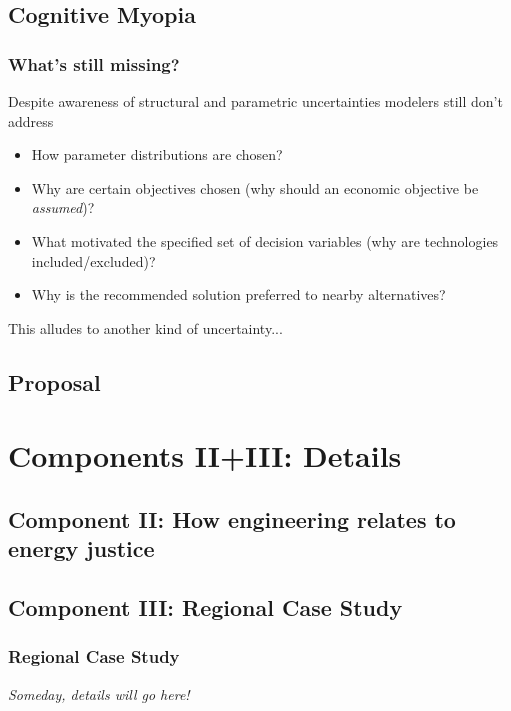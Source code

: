 \subsection{Cognitive Myopia}
\begin{frame}
    \frametitle{What's still missing?}

    Despite awareness of structural and parametric uncertainties modelers still don't address
    \begin{itemize}
        \item How parameter distributions are chosen?
        \item Why are certain objectives chosen (why should an economic objective be \textit{assumed})?
        \item What motivated the specified set of decision variables (why are technologies included/excluded)?
        \item Why is the recommended solution preferred to nearby alternatives?
    \end{itemize}

    This alludes to another kind of uncertainty... 
\end{frame}



\subsection{Proposal}


\section{Components II+III: Details}
\subsection{Component II: How engineering relates to energy justice}

\subsection{Component III: Regional Case Study}
\begin{frame}
    \frametitle{Regional Case Study}

    \textit{Someday, details will go here!}

\end{frame}



